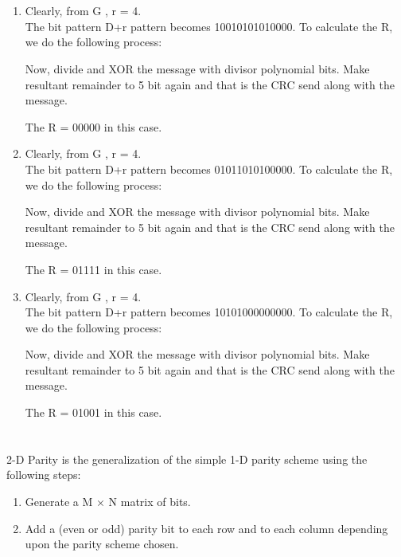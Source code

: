 \documentclass[12pt]{article}
\begin{document}
\section{}

\begin{enumerate}[label=(\alph*)]
    
    \item Clearly, from G , r = 4. \\
The bit pattern D+r pattern becomes 10010101010000.
To calculate the R, we do the following process:

Now, divide and XOR the message with divisor polynomial bits. Make resultant remainder to 5 bit again and that is the CRC send along with the message.

The R = 00000 in this case.
    
    \item Clearly, from G , r = 4. \\
The bit pattern D+r pattern becomes 01011010100000.
To calculate the R, we do the following process:

Now, divide and XOR the message with divisor polynomial bits. Make resultant remainder to 5 bit again and that is the CRC send along with the message.

The R = 01111 in this case.
    
    \item Clearly, from G , r = 4. \\
The bit pattern D+r pattern becomes 10101000000000.
To calculate the R, we do the following process:

Now, divide and XOR the message with divisor polynomial bits. Make resultant remainder to 5 bit again and that is the CRC send along with the message.

The R = 01001 in this case.
\end{enumerate}


\section{}

2-D Parity is the generalization of the simple 1-D parity scheme using the following steps:

\begin{enumerate}
    \item Generate a M $\times$ N matrix of bits.
    \item Add a (even or odd) parity bit to each row and to each column depending upon the parity scheme chosen.
\end{enumerate}
\end{document}
